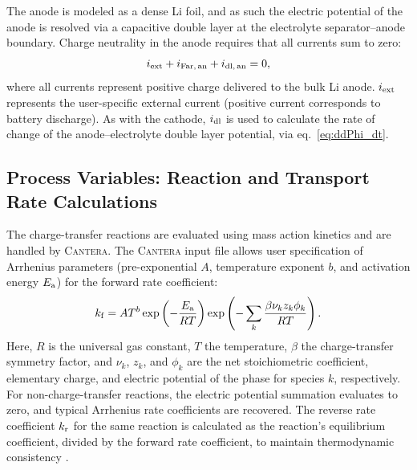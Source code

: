 \documentclass{elsarticle}
\begin{document}
The anode is modeled as a dense Li foil, and as such the electric potential of the anode is resolved via a capacitive double layer at the electrolyte separator--anode boundary.  Charge neutrality in the anode requires that all currents sum to zero:
\begin{equation}\label{eq:ChargeConsAnode}
    i_{\rm ext} + i_{\rm Far,\,an} + i_{\rm dl,\,an} = 0,
\end{equation}
where all currents represent positive charge delivered to the bulk Li anode.  $i_{\rm ext}$ represents the user-specific external current (positive current corresponds to battery discharge).  As with the cathode, $i_{\rm dl}$ is used to calculate the rate of change of the anode--electrolyte double layer potential, via eq.~\ref{eq:ddPhi_dt}.


\subsection{Process Variables: Reaction and Transport Rate Calculations}

The charge-transfer reactions are evaluated using mass action kinetics and are handled by \textsc{Cantera}. The \textsc{Cantera} input file allows user specification of Arrhenius parameters (pre-exponential $A$, temperature exponent $b$, and activation energy $E_{\rm a}$) for the forward rate coefficient:
\begin{equation}\label{eq:k_fwd_echem}
    k_{\rm f} = AT^b\exp\left(-\frac{E_{\rm a}}{RT}\right)\exp\left(-\sum_k\frac{\beta\nu_kz_k\phi_k}{RT}\right).
\end{equation}
Here, $R$ is the universal gas constant, $T$ the temperature, $\beta$ the charge-transfer symmetry factor, and $\nu_k$, $z_k$, and $\phi_k$ are the net stoichiometric coefficient, elementary charge, and electric potential of the phase for species $k$, respectively.  For non-charge-transfer reactions, the electric potential summation evaluates to zero, and typical Arrhenius rate coefficients are recovered.  The reverse rate coefficient $k_{\rm r}$ for the same reaction is calculated as the reaction's equilibrium coefficient, divided by the forward rate coefficient, to maintain thermodynamic consistency \cite{DeCaluwe_2018}.
\end{document}

